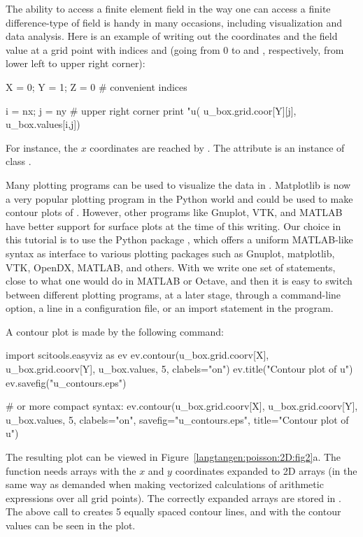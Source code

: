 The ability to access a finite element field in the way one can access
a finite difference-type of field is handy in many occasions,
including visualization and data analysis.  Here is an example of
writing out the coordinates and the field value at a grid point with
indices  and
 (going from 0 to
 and
, respectively, from lower left to
upper right corner):
\begin{python}
X = 0; Y = 1; Z = 0  # convenient indices

i = nx; j = ny   # upper right corner
print "u(%
                       u_box.grid.coor[Y][j],
                       u_box.values[i,j])
\end{python}
For instance,
the $x$ coordinates are reached by .
The  attribute is an instance of class .

Many plotting programs can be used to visualize the data in
. Matplotlib is now a very popular
plotting program in the Python world and could be used to make contour
plots of . However, other programs
like Gnuplot, VTK, and MATLAB have better support for surface
plots at the time of this writing.
Our choice in this tutorial is to use the Python package
, which offers a
uniform MATLAB-like syntax as interface to various plotting packages
such as Gnuplot, matplotlib, VTK, OpenDX, MATLAB, and others. With
 we write one set of
statements, close to what one would do in MATLAB or Octave, and then
it is easy to switch between different plotting programs, at a later
stage, through a command-line option, a line in a configuration file,
or an import statement in the program.

\pagebreak

A contour plot is made by the following  command:
\begin{python}
import scitools.easyviz as ev
ev.contour(u_box.grid.coorv[X], u_box.grid.coorv[Y], u_box.values,
           5, clabels="on")
ev.title("Contour plot of u")
ev.savefig("u_contours.eps")

# or more compact syntax:
ev.contour(u_box.grid.coorv[X], u_box.grid.coorv[Y], u_box.values,
           5, clabels="on",
           savefig="u_contours.eps", title="Contour plot of u")
\end{python}
The resulting plot can be viewed in
Figure~\ref{langtangen:poisson:2D:fig2}a.  The
 function needs arrays with the
$x$ and $y$ coordinates expanded to 2D arrays (in the same way as
demanded when making vectorized 
calculations of arithmetic expressions over all grid points).  The
correctly expanded arrays are stored in
.  The above call to
 creates 5 equally spaced
contour lines, and with 
the contour values can be seen in the plot.

